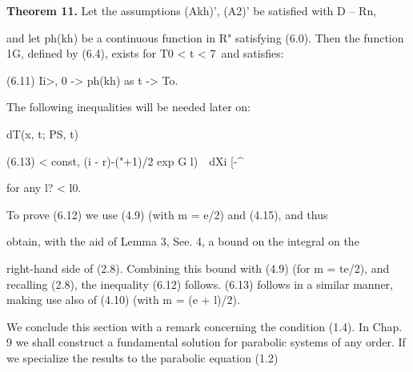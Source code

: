 \medskip\noindent\textbf{Theorem 11.} Let the assumptions (Akh)', (A2)' be satisfied with D -- Rn,

\begin{ocrformula}
and let ph(kh) be a continuous function in R" satisfying (6.0). Then the function
1G, defined by (6.4), exists for T0 < t < 7\ and satisfies:
\end{ocrformula}

\begin{ocrformula}
(6.10)                         L\V{x,         i)=0                  for r0 < t <           Tlf
\end{ocrformula}

\begin{ocrformula}
(6.11)                             Ii>,       0 -> ph(kh)             as t -> To.
\end{ocrformula}

The following inequalities will be needed later on:

\begin{ocrformula}
(6-12)           \T{x, t; PS, r)\ <            const, (i -        r)-^     exp                             '
[~ts*_             *]']
\end{ocrformula}

dT(x, t; PS, t)

\begin{ocrformula}
(6.13)                                    <    const, (i -        r)-("+1)/2 exp                     G l)~\
dXi                                                                [-^
\end{ocrformula}

for any l? < l0.

\begin{ocrformula}
To prove   (6.12) we use (4.9) (with m = e/2) and (4.15), and thus
\end{ocrformula}

obtain, with the aid of Lemma 3, See. 4, a bound on the integral on the

\begin{ocrformula}
right-hand    side of (2.8). Combining     this bound  with (4.9) (for m = te/2),
and  recalling (2.8), the inequality (6.12) follows. (6.13) follows in a similar
manner,   making   use also of (4.10) (with m = (e + l)/2).
\end{ocrformula}

We conclude this section with a remark concerning the condition (1.4). In Chap. 9 we shall construct a fundamental solution for parabolic systems of any order. If we specialize the results to the parabolic equation (1.2)

